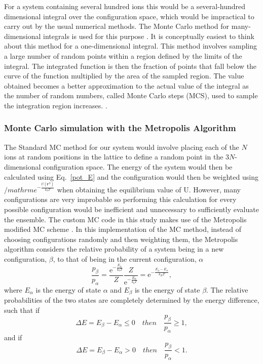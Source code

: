 \documentclass[11pt, twoside]{report}
\begin{document}
For a system containing several hundred ions this would be a several-hundred dimensional integral over the configuration space, which would be impractical to carry out by the usual numerical methods. The Monte Carlo method for many-dimensional integrals is used for this purpose \cite{Metropolis}. It is conceptually easiest to think about this method for a one-dimensional integral. This method involves sampling a large number of random points within a region defined by the limits of the integral. The integrated function is then the fraction of points that fall below the curve of the function multiplied by the area of the sampled region. The value obtained becomes a better approximation to the actual value of the integral as the number of random numbers, called Monte Carlo steps (MCS), used to sample the integration region increases. \cite{Lesar3}.


\subsubsection{Monte Carlo simulation with the Metropolis Algorithm }
The Standard MC method for our system would involve placing each of the $N$ ions at random positions in the lattice to define a random point in the $3N$-dimensional configuration space. The energy of the system would then be calculated using Eq.~\ref{pot_E} and the configuration would then be weighted using $/mathrm{e}^{-\frac{U(\mathbf{r}^N)}{k_bT}}$ when obtaining the equilibrium value of U. However, many configurations are very improbable so performing this calculation for every possible configuration would be inefficient and unnecessary to sufficiently evaluate the ensemble. The custom MC code in this study makes use of the Metropolis modified MC scheme \cite{Metropolis}. In this implementation of the MC method, instead of choosing configurations randomly and then weighting them, the Metropolis algorithm considers the relative probability of a system being in a new configuration, $\beta$, to that of being in the current configuration, $\alpha$
\begin{equation}\label{relative_prob}
\frac{p_\beta}{p_\alpha} = \frac{  \mathrm{e}^{-\frac{E_\alpha}{k_bT}} }{Z} \frac{Z}{  \mathrm{e}^{-\frac{E_\alpha}{k_bT}} } = \mathrm{e}^{- \frac{E_\beta - E_\alpha}{k_BT}},
\end{equation}
where $E_\alpha$ is the energy of state $\alpha$ and $E_\beta$ is the energy of state $\beta$.
The relative probabilities of the two states are completely determined by the energy 
difference, such that if
\begin{equation}\label{met}
\Delta E = E_{\beta} - E_{\alpha} \leq 0    \quad  then  \quad   \frac{p_{\beta}}{p_{\alpha}} \geq 1 ,
\end{equation}
and if
\begin{equation}\label{met2}
\Delta E = E_{\beta} - E_{\alpha} > 0   \quad   then   \quad   \frac{p_{\beta}}{p_{\alpha}} < 1 .
\end{equation}
\end{document}
